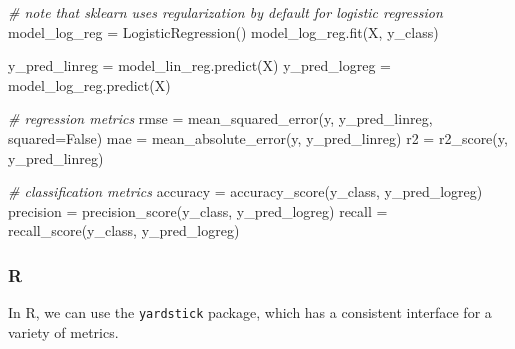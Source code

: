 \documentclass[
  letterpaper,
]{krantz}
\newenvironment{Shaded}{}{}
\newcommand{\CommentTok}[1]{\textcolor[rgb]{0.38,0.63,0.69}{\textit{#1}}}
\newcommand{\NormalTok}[1]{#1}
\newcommand{\OperatorTok}[1]{\textcolor[rgb]{0.40,0.40,0.40}{#1}}
\newcommand{\VariableTok}[1]{\textcolor[rgb]{0.10,0.09,0.49}{#1}}
\begin{document}
\begin{Shaded}
\begin{Highlighting}[]
\CommentTok{\# note that sklearn uses regularization by default for logistic regression}
\NormalTok{model\_log\_reg }\OperatorTok{=}\NormalTok{ LogisticRegression() }
\NormalTok{model\_log\_reg.fit(X, y\_class)}
\end{Highlighting}
\end{Shaded}

\begin{Shaded}
\begin{Highlighting}[]

\NormalTok{y\_pred\_linreg }\OperatorTok{=}\NormalTok{ model\_lin\_reg.predict(X)}
\NormalTok{y\_pred\_logreg }\OperatorTok{=}\NormalTok{ model\_log\_reg.predict(X)}


\CommentTok{\# regression metrics}
\NormalTok{rmse }\OperatorTok{=}\NormalTok{ mean\_squared\_error(y, y\_pred\_linreg, squared}\OperatorTok{=}\VariableTok{False}\NormalTok{)}
\NormalTok{mae }\OperatorTok{=}\NormalTok{ mean\_absolute\_error(y, y\_pred\_linreg)}
\NormalTok{r2 }\OperatorTok{=}\NormalTok{ r2\_score(y, y\_pred\_linreg)}


\CommentTok{\# classification metrics}
\NormalTok{accuracy }\OperatorTok{=}\NormalTok{ accuracy\_score(y\_class, y\_pred\_logreg)}
\NormalTok{precision }\OperatorTok{=}\NormalTok{ precision\_score(y\_class, y\_pred\_logreg)}
\NormalTok{recall }\OperatorTok{=}\NormalTok{ recall\_score(y\_class, y\_pred\_logreg)}
\end{Highlighting}
\end{Shaded}

\subsubsection{R}

In R, we can use the \texttt{yardstick} package, which has a consistent
interface for a variety of metrics.
\end{document}

